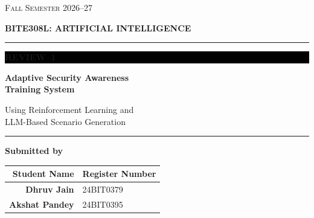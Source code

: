 \documentclass[12pt,a4paper]{article}
\begin{document}

\begin{titlepage}
\centering

\vspace*{1.1cm}

{\large\color{black!65}\textsc{Fall Semester 2026--27}\par}
\vspace{0.35cm}
{\Large\bfseries\color{black}BITE308L: ARTIFICIAL INTELLIGENCE\par}

\vspace{1.1cm}
{\color{black}\rule{0.88\textwidth}{1.2pt}\par}
\vspace{0.7cm}

\colorbox{black}{%
    \parbox{0.30\textwidth}{%
        \centering\color{white}\large\bfseries REVIEW--1
    }%
}

\vspace{1cm}

{\fontsize{25}{31}\selectfont\bfseries\color{black!85}
Adaptive Security Awareness\\[0.18cm]
Training System\par}

\vspace{0.55cm}

{\Large\color{black}
Using Reinforcement Learning and\\[0.12cm]
LLM-Based Scenario Generation\par}

\vspace{0.7cm}
{\color{black}\rule{0.88\textwidth}{1.2pt}\par}

\vspace{1.3cm}

{\large\bfseries Submitted by\par}
\vspace{0.55cm}

\renewcommand{\arraystretch}{1.45}
\begin{tabular}{@{}>{\bfseries}r l@{}}
Student Name & Register Number \\
\midrule
Dhruv Jain & 24BIT0379 \\
Akshat Pandey & 24BIT0395
\end{tabular}

\end{titlepage}

\tableofcontents
\clearpage
{}
\end{document}
